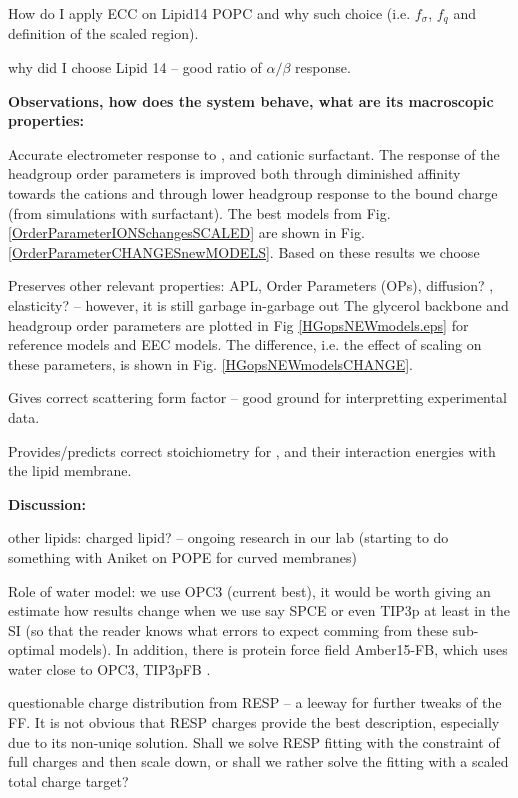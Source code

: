 \documentclass[aip,jcp]{revtex4}
\begin{document}
How do I apply ECC on Lipid14 POPC and why such choice (i.e. $f_\sigma$, $f_q$ and definition of the scaled region).

why did I choose Lipid 14 -- good ratio of $\alpha / \beta$ response.

\textbf{Observations, how does the system behave, what are its macroscopic properties:}

Accurate electrometer response to ,  and  cationic surfactant. 
The response of the headgroup order parameters is improved both through diminished affinity towards the cations and through lower headgroup response to the bound charge (from simulations with  surfactant). 
The best models from Fig.  \ref{OrderParameterIONSchangesSCALED} are shown in
Fig. \ref{OrderParameterCHANGESnewMODELS}. Based on these results we choose

Preserves other relevant properties: APL, Order Parameters (OPs), diffusion? , elasticity?  -- however, it is still garbage in-garbage out
The glycerol backbone and headgroup order parameters are plotted in
Fig \ref{HGopsNEWmodels.eps} for reference models and EEC models. The difference,
i.e. the effect of scaling on these parameters, is shown in Fig. \ref{HGopsNEWmodelsCHANGE}.

Gives correct scattering form factor -- good ground for interpretting experimental data.

Provides/predicts correct stoichiometry for ,  and their interaction energies with the lipid membrane.

\textbf{Discussion:}

other lipids: charged lipid? -- ongoing research in our lab (starting to do something with Aniket on POPE for curved membranes)

Role of water model: we use OPC3 (current best), it would be worth giving an estimate how results change when we use say SPCE or even TIP3p at least in the SI (so that the reader knows what errors to expect comming from these sub-optimal models). In addition, there is protein force field Amber15-FB, which uses water close to OPC3, TIP3pFB .

questionable charge distribution from RESP -- a leeway for further tweaks of the FF.
It is not obvious that RESP charges provide the best description, especially due to its non-uniqe solution. 
Shall we solve RESP fitting with the constraint of full charges and then scale down, or shall we rather solve the fitting with a scaled total charge target?
\end{document}
